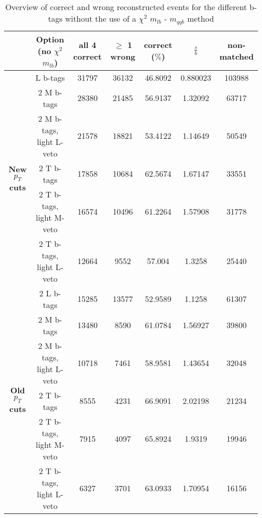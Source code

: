 \documentclass[a4paper,12pt]{report}
\begin{document}
\begin{landscape}
\begin{table}[!h] 
 \begin{tabular}{c|c|c|c|c|c|c} 
& \textbf{Option} (no $\chi^{2}$ $m_{lb}$) & all 4 correct & $\geq$ 1 wrong & correct ($\%$)       & $\frac{s}{b}$ & non-matched \\ \hline 
\multirow{6}{*}{\textbf{New $p_T$ cuts}} 
& L b-tags                & 31797 & 36132 & 46.8092 & 0.880023 & 103988  \\ 
&2 M b-tags               & 28380 & 21485 & 56.9137 & 1.32092  & 63717  \\ 
&2 M b-tags, light L-veto & 21578 & 18821 & 53.4122 & 1.14649  & 50549  \\ 
&2 T b-tags               & 17858 & 10684 & 62.5674 & 1.67147  & 33551  \\ 
&2 T b-tags, light M-veto & 16574 & 10496 & 61.2264 & 1.57908  & 31778  \\ 
&2 T b-tags, light L-veto & 12664 & 9552  & 57.004  & 1.3258   & 25440  \\
\hline
\multirow{6}{*}{\textbf{Old $p_T$ cuts}} 
& 2 L b-tags              & 15285 & 13577 & 52.9589 & 1.1258 & 61307  \\ 
& 2 M b-tags              & 13480 & 8590 & 61.0784 & 1.56927 & 39800  \\ 
& 2 M b-tags, light L-veto & 10718 & 7461 & 58.9581 & 1.43654 & 32048 \\ 
& 2 T b-tags              & 8555 & 4231 & 66.9091 & 2.02198 & 21234  \\ 
& 2 T b-tags, light M-veto & 7915 & 4097 & 65.8924 & 1.9319 & 19946  \\ 
& 2 T b-tags, light L-veto & 6327 & 3701 & 63.0933 & 1.70954 & 16156  \\ 
 \end{tabular} 
\caption{Overview of correct and wrong reconstructed events for the different b-tags without the use of a $\chi^{2}$ $m_{lb}$ - $m_{qqb}$ method} 
 \end{table} 
 

\end{landscape}
\end{document}
